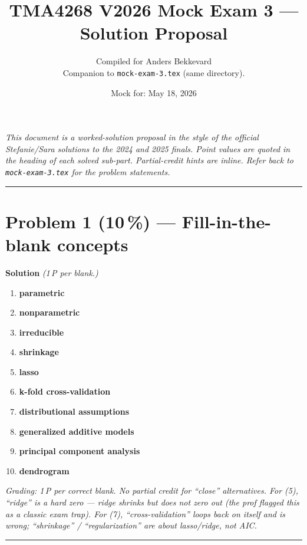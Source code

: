 \documentclass[11pt,a4paper]{article}
\title{TMA4268 V2026 Mock Exam 3 --- Solution Proposal\\[0.3em]
\large}
\author{Compiled for Anders Bekkevard\\[0.2em]
\small Companion to \texttt{mock-exam-3.tex} (same directory).}
\date{Mock for: May 18, 2026}
\newcommand{\points}[1]{\textbf{(#1\,\%)}}
\newcommand{\sol}{\noindent\textbf{Solution}}
\begin{document}
\maketitle

\noindent\textit{This document is a worked-solution proposal in the style of the official Stefanie/Sara solutions
to the 2024 and 2025 finals. Point values are quoted in the heading of each solved sub-part. Partial-credit
hints are inline. Refer back to \texttt{mock-exam-3.tex} for the problem statements.}

\vspace{0.6em}
\hrule
\vspace{1em}

\section*{Problem 1 \points{10} --- Fill-in-the-blank concepts}

\sol{} \emph{(1\,P per blank.)}

\begin{enumerate}[(1)]
  \item \textbf{parametric}
  \item \textbf{nonparametric}
  \item \textbf{irreducible}
  \item \textbf{shrinkage}
  \item \textbf{lasso}
  \item \textbf{k-fold cross-validation}
  \item \textbf{distributional assumptions}
  \item \textbf{generalized additive models}
  \item \textbf{principal component analysis}
  \item \textbf{dendrogram}
\end{enumerate}

\noindent\emph{Grading: 1\,P per correct blank. No partial credit for ``close'' alternatives.
For (5), ``ridge'' is a hard zero --- ridge shrinks but does not zero out (the prof flagged this
as a classic exam trap). For (7), ``cross-validation'' loops back on itself and is wrong;
``shrinkage'' / ``regularization'' are about lasso/ridge, not AIC.}

\vspace{0.6em}
\hrule
\vspace{1em}
\end{document}
